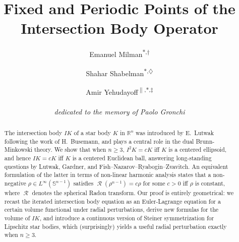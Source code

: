 \documentclass[11pt]{article}
\theoremstyle{definition}
\theoremstyle{proof}
\DeclareMathOperator{\+}{\mathop{\tilde{+}}}
\DeclareMathOperator{\Rad}{\mathcal{R}}
\newcommand{\R}{\mathbb{R}}
\renewcommand{\S}{\mathbb{S}}
\numberwithin{equation}{section}
\numberwithin{equation}{section}
\begin{document}
\renewcommand*{\thefootnote}{\fnsymbol{footnote}}

\author{Emanuel Milman\textsuperscript{$*$,$\dagger$}
\and
Shahar Shabelman\textsuperscript{$*$,$\diamondsuit$}
\and
Amir Yehudayoff\textsuperscript{$\|$,$*$,$\ddagger$}\\\\
\emph{dedicated to the memory of Paolo Gronchi}
}


\begingroup    \renewcommand{\thefootnote}{}    
\endgroup



\title{Fixed and Periodic Points of the Intersection Body Operator}


\date{\nonumber} 
\maketitle

\begin{abstract}
The intersection body $IK$ of a star body $K$ in $\R^n$ was introduced by E.~Lutwak following the work of H.~Busemann, and plays a central role in the dual Brunn-Minkowski theory. We show that when $n \geq 3$, $I^2 K = c K$ iff $K$ is a centered ellipsoid, and hence $I K = c K$ iff $K$ is a centered Euclidean ball, answering long-standing questions by Lutwak, Gardner, and Fish--Nazarov--Ryabogin--Zvavitch. An equivalent formulation of the latter in terms of non-linear harmonic analysis states that a non-negative $\rho \in L^\infty(\S^{n-1})$ satisfies $\Rad(\rho^{n-1}) = c \rho$ for some $c > 0$ iff $\rho$ is 
constant, where $\Rad$ denotes the spherical Radon transform.  Our proof is entirely geometrical: we recast the iterated intersection body equation as an Euler-Lagrange equation for a certain volume functional under radial perturbations, derive new formulas for the volume of $I K$, and introduce a continuous version of Steiner symmetrization for Lipschitz star bodies, which (surprisingly) yields a useful radial perturbation exactly when $n\geq 3$. 
\end{abstract}
\end{document}
